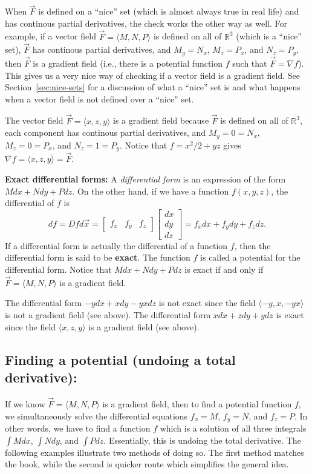 When $\vec F$ is defined on a ``nice'' set (which is almost always
true in real life) and has continous partial derivatives, the check
works the other way as well.  For example, if a vector field $\vec
F=\langle M,N,P\rangle$ is defined on all of $\mathbb{R}^3$ (which is a ``nice''
set), $\vec F$ has continous partial derivatives, and $M_y=N_x$,
$M_z=P_x$, and $N_z=P_y$, then $\vec F$ is a gradient field (i.e.,
there is a potential function $f$ such that $\vec F = \nabla f$).  This
gives us a very nice way of checking if a vector field is a gradient
field.  See Section~\ref{sec:nice-sets} for a discussion of what a ``nice'' set is
and what happens when a vector field is not defined over a ``nice''
set.


\begin{example}
The vector field $\vec F=\langle x,z,y\rangle$ is
  a gradient field because $\vec F$ is defined on all of
  $\mathbb{R}^3$, each component has continous partial derivatives,
  and $M_y=0=N_x$, $M_z=0=P_x$, and $N_z=1=P_y$.  Notice that
  $f=x^2/2+yz$ gives $\nabla f = \langle x,z,y\rangle=\vec F$.
\end{example}

\textbf{Exact differential forms:} A \emph{differential form} is an
expression of the form {$Mdx+Ndy+Pdz$}.  On the other hand, if we have
a function $f(x,y,z)$, the differential of $f$ is 
$$df = Df d\vec x
= \begin{bmatrix}f_x&f_y&f_z
\end{bmatrix}\begin{bmatrix}dx\\dy\\dz\end{bmatrix}=f_x dx+f_y dy+f_z
dz.$$ If a differential form is actually the differential of a
function {$f$}, then the differential form is said to be
\textbf{exact}.  The function {$f$} is called a potential for the
differential form.  Notice that {$Mdx+Ndy+Pdz$} is exact if and only
if {$\vec F = \langle M,N,P\rangle$} is a gradient field.

\begin{example}
The differential form $-ydx+xdy-yxdz$ is not
  exact since the field $\langle-y,x,-yx\rangle$ is not a gradient
  field (see above).  The differential form $xdx+zdy+ydz$ is exact
  since the field $\langle x,z,y\rangle$ is a gradient field (see
  above).
\end{example}
\subsection{Finding a potential (undoing a total derivative):} If we know
$\vec F=\langle M,N,P\rangle$ is a gradient field, then to find a potential
function $f$, we simultaneously solve the differential equations
$f_x=M$, $f_y=N$, and $f_z=P$.  In other words, we have to find a
function $f$ which is a solution of all three integrals $\int Mdx$, $\int
Ndy$, and $\int Pdz$.  Essentially, this is undoing the total
derivative. The following examples illustrate two methods of doing so.
The first method matches the book, while the second is quicker route which
simplifies the general idea.

